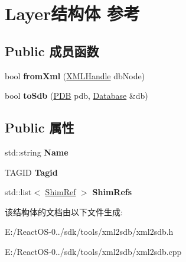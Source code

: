 \hypertarget{struct_layer}{}\section{Layer结构体 参考}
\label{struct_layer}
\subsection*{Public 成员函数}
\begin{DoxyCompactItemize}
\item 
\mbox{\label{struct_layer_a2b3afa22468f9250870a5e1960883df5}} 
bool {\bfseries from\+Xml} (\hyperlink{classtinyxml2_1_1_x_m_l_handle}{X\+M\+L\+Handle} db\+Node)
\item 
\mbox{\label{struct_layer_ad9dc3aafc67a0fd46d2db756e68a0404}} 
bool {\bfseries to\+Sdb} (\hyperlink{struct___d_b}{P\+DB} pdb, \hyperlink{struct_database}{Database} \&db)
\end{DoxyCompactItemize}
\subsection*{Public 属性}
\begin{DoxyCompactItemize}
\item 
\mbox{\label{struct_layer_a0e9a5c14a3539849bf1ffa78bf6867dc}} 
std\+::string {\bfseries Name}
\item 
\mbox{\label{struct_layer_acd41bb9b24f3a48bb507a133bf833dd0}} 
T\+A\+G\+ID {\bfseries Tagid}
\item 
\mbox{\label{struct_layer_a772d230f313812b3ed6ec47a86b18fb4}} 
std\+::list$<$ \hyperlink{struct_shim_ref}{Shim\+Ref} $>$ {\bfseries Shim\+Refs}
\end{DoxyCompactItemize}


该结构体的文档由以下文件生成\+:\begin{DoxyCompactItemize}
\item 
E\+:/\+React\+O\+S-\/0../sdk/tools/xml2sdb/xml2sdb.\+h\item 
E\+:/\+React\+O\+S-\/0../sdk/tools/xml2sdb/xml2sdb.\+cpp\end{DoxyCompactItemize}
